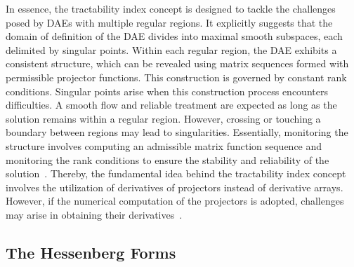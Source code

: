 In essence, the tractability index concept is designed to tackle the challenges posed by \acp{DAE} with multiple regular regions. It explicitly suggests that the domain of definition of the \ac{DAE} divides into maximal smooth subspaces, each delimited by singular points. Within each regular region, the \ac{DAE} exhibits a consistent structure, which can be revealed using matrix sequences formed with permissible projector functions. This construction is governed by constant rank conditions. Singular points arise when this construction process encounters difficulties. A smooth flow and reliable treatment are expected as long as the solution remains within a regular region. However, crossing or touching a boundary between regions may lead to singularities. Essentially, monitoring the structure involves computing an admissible matrix function sequence and monitoring the rank conditions to ensure the stability and reliability of the solution~\cite{lamour2011computational}. Thereby, the fundamental idea behind the tractability index concept involves the utilization of derivatives of projectors instead of derivative arrays. However, if the numerical computation of the projectors is adopted, challenges may arise in obtaining their derivatives~\cite{mehrmann2015index}.

\subsection{The Hessenberg Forms}


